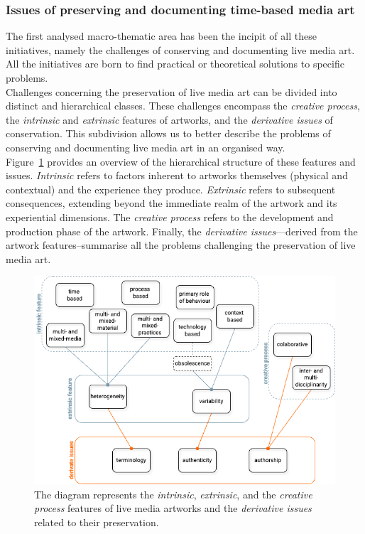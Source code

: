 \subsubsection{Issues of preserving and documenting time-based media art}
The first analysed macro-thematic area has been the incipit of all these initiatives, namely the challenges of conserving and documenting live media art. All the initiatives are born to find practical or theoretical solutions to specific problems.\\ 
Challenges concerning the preservation of live media art can be divided into distinct and hierarchical classes. These challenges encompass the \textit{creative process}, the \textit{intrinsic} and \textit{extrinsic} features of artworks, and the \textit{derivative issues} of conservation. This subdivision allows us to better describe the problems of conserving and documenting live media art in an organised way.\\
Figure~\ref{fig:c1-issues} provides an overview of the hierarchical structure of these features and issues. \textit{Intrinsic} refers to factors inherent to artworks themselves (physical and contextual) and the experience they produce. \textit{Extrinsic} refers to subsequent consequences, extending beyond the immediate realm of the artwork and its experiential dimensions. The \textit{creative process} refers to the development and production phase of the artwork. Finally, the \textit{derivative issues}—derived from the artwork features–summarise all the problems challenging the preservation of live media art. 

\begin{figure}[!h]
    \centering
    \includegraphics[width=\textwidth]{chapters/1-state_of_the_art/image/graph-issues.png}
    \caption{The diagram represents the \textit{intrinsic}, \textit{extrinsic}, and the \textit{creative process} features of live media artworks and the \textit{derivative issues} related to their preservation.}
    \label{fig:c1-issues}
\end{figure}

